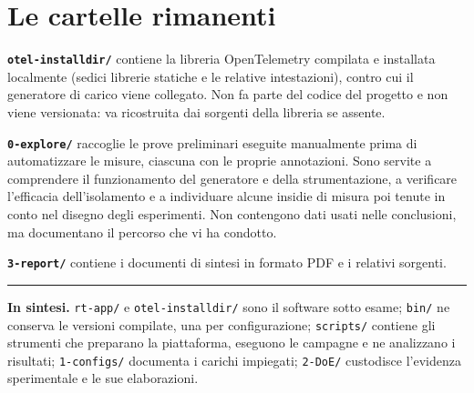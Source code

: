 \documentclass[11pt,a4paper]{article}
\begin{document}
\section{Le cartelle rimanenti}

\textbf{\texttt{otel-installdir/}} contiene la libreria OpenTelemetry compilata e installata
localmente (sedici librerie statiche e le relative intestazioni), contro cui il generatore di carico
viene collegato. Non fa parte del codice del progetto e non viene versionata: va ricostruita dai
sorgenti della libreria se assente.

\textbf{\texttt{0-explore/}} raccoglie le prove preliminari eseguite manualmente prima di
automatizzare le misure, ciascuna con le proprie annotazioni. Sono servite a comprendere il
funzionamento del generatore e della strumentazione, a verificare l'efficacia dell'isolamento e a
individuare alcune insidie di misura poi tenute in conto nel disegno degli esperimenti. Non
contengono dati usati nelle conclusioni, ma documentano il percorso che vi ha condotto.

\textbf{\texttt{3-report/}} contiene i documenti di sintesi in formato PDF e i relativi sorgenti.

\vspace{.8em}
\hrule
\vspace{.6em}

\small
\textbf{In sintesi.} \texttt{rt-app/} e \texttt{otel-installdir/} sono il software sotto esame;
\texttt{bin/} ne conserva le versioni compilate, una per configurazione; \texttt{scripts/} contiene
gli strumenti che preparano la piattaforma, eseguono le campagne e ne analizzano i risultati;
\texttt{1-configs/} documenta i carichi impiegati; \texttt{2-DoE/} custodisce l'evidenza
sperimentale e le sue elaborazioni.
\end{document}
